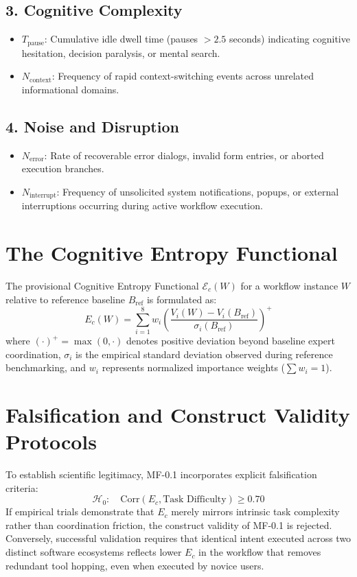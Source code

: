 \documentclass[11pt,a4paper]{article}
\begin{document}
\subsection{3. Cognitive Complexity}
\begin{itemize}
    \item $T_{\text{pause}}$: Cumulative idle dwell time (pauses $> 2.5$ seconds) indicating cognitive hesitation, decision paralysis, or mental search.
    \item $N_{\text{context}}$: Frequency of rapid context-switching events across unrelated informational domains.
\end{itemize}

\subsection{4. Noise and Disruption}
\begin{itemize}
    \item $N_{\text{error}}$: Rate of recoverable error dialogs, invalid form entries, or aborted execution branches.
    \item $N_{\text{interrupt}}$: Frequency of unsolicited system notifications, popups, or external interruptions occurring during active workflow execution.
\end{itemize}

\section{The Cognitive Entropy Functional}
The provisional Cognitive Entropy Functional $\mathcal{E}_c(W)$ for a workflow instance $W$ relative to reference baseline $B_{\text{ref}}$ is formulated as:
\begin{equation}
E_c(W) = \sum_{i=1}^8 w_i \left( \frac{V_i(W) - V_i(B_{\text{ref}})}{\sigma_i(B_{\text{ref}})} \right)^+
\end{equation}
where $(\cdot)^+ = \max(0, \cdot)$ denotes positive deviation beyond baseline expert coordination, $\sigma_i$ is the empirical standard deviation observed during reference benchmarking, and $w_i$ represents normalized importance weights ($\sum w_i = 1$).

\section{Falsification and Construct Validity Protocols}
To establish scientific legitimacy, MF-0.1 incorporates explicit falsification criteria:
\begin{equation}
\mathcal{H}_0: \quad \text{Corr}\left(E_c, \text{Task Difficulty}\right) \ge 0.70
\end{equation}
If empirical trials demonstrate that $E_c$ merely mirrors intrinsic task complexity rather than coordination friction, the construct validity of MF-0.1 is rejected. Conversely, successful validation requires that identical intent executed across two distinct software ecosystems reflects lower $E_c$ in the workflow that removes redundant tool hopping, even when executed by novice users.
\end{document}
